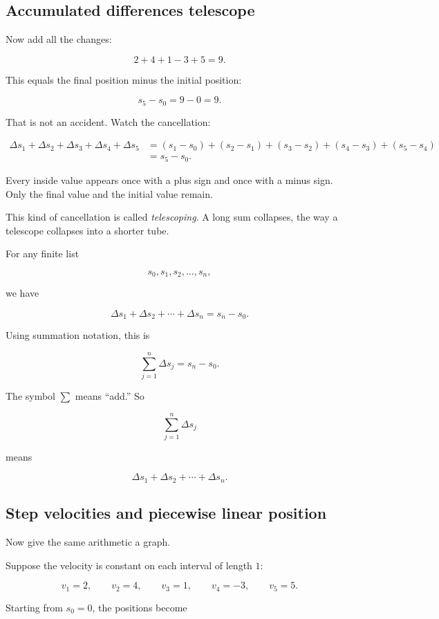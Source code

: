 \subsection{Accumulated differences telescope}

Now add all the changes:

\[
2+4+1-3+5=9.
\]

This equals the final position minus the initial position:

\[
s_5-s_0=9-0=9.
\]

That is not an accident. Watch the cancellation:

\[
\begin{aligned}
\Delta s_1+\Delta s_2+\Delta s_3+\Delta s_4+\Delta s_5
&=(s_1-s_0)+(s_2-s_1)+(s_3-s_2)+(s_4-s_3)+(s_5-s_4)\\
&=s_5-s_0.
\end{aligned}
\]

Every inside value appears once with a plus sign and once with a minus sign. Only the final value and the initial value remain.

This kind of cancellation is called \emph{telescoping}. A long sum collapses, the way a telescope collapses into a shorter tube.

For any finite list

\[
s_0,s_1,s_2,\ldots,s_n,
\]

we have

\[
\boxed{\Delta s_1+\Delta s_2+\cdots+\Delta s_n=s_n-s_0.}
\]

Using summation notation, this is

\[
\boxed{\sum_{j=1}^{n}\Delta s_j=s_n-s_0.}
\]

The symbol \(\sum\) means ``add.'' So

\[
\sum_{j=1}^{n}\Delta s_j
\]

means

\[
\Delta s_1+\Delta s_2+\cdots+\Delta s_n.
\]

\subsection{Step velocities and piecewise linear position}

Now give the same arithmetic a graph.

Suppose the velocity is constant on each interval of length \(1\):

\[
v_1=2,\qquad v_2=4,\qquad v_3=1,\qquad v_4=-3,\qquad v_5=5.
\]

Starting from \(s_0=0\), the positions become

